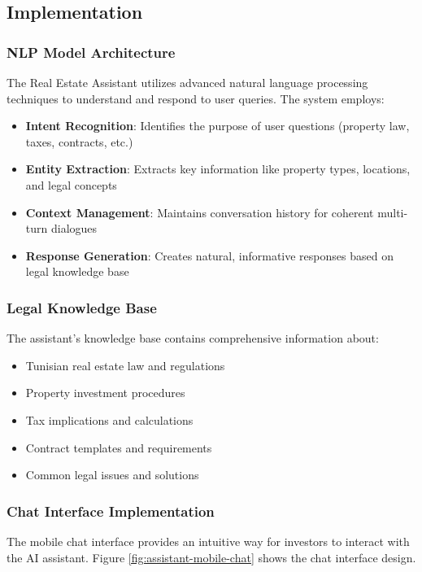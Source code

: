 \subsection{Implementation}
\subsubsection{NLP Model Architecture}
The Real Estate Assistant utilizes advanced natural language processing techniques to understand and respond to user queries. The system employs:

\begin{itemize}
    \item \textbf{Intent Recognition}: Identifies the purpose of user questions (property law, taxes, contracts, etc.)
    \item \textbf{Entity Extraction}: Extracts key information like property types, locations, and legal concepts
    \item \textbf{Context Management}: Maintains conversation history for coherent multi-turn dialogues
    \item \textbf{Response Generation}: Creates natural, informative responses based on legal knowledge base
\end{itemize}

\subsubsection{Legal Knowledge Base}
The assistant's knowledge base contains comprehensive information about:
\begin{itemize}
    \item Tunisian real estate law and regulations
    \item Property investment procedures
    \item Tax implications and calculations
    \item Contract templates and requirements
    \item Common legal issues and solutions
\end{itemize}

\subsubsection{Chat Interface Implementation}
The mobile chat interface provides an intuitive way for investors to interact with the AI assistant. Figure \ref{fig:assistant-mobile-chat} shows the chat interface design.

